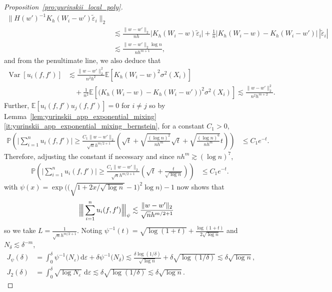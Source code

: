 \documentclass[11pt,lof]{puthesis}
\renewcommand{\P}{\ensuremath{\mathbb{P}}}
\newcommand{\E}{\ensuremath{\mathbb{E}}}
\newcommand{\Bigvvvert}{{\Big\vert\kern-0.3ex\Big\vert\kern-0.3ex\Big\vert}}
\DeclareMathOperator{\Var}{Var}
\newcommand{\diff}[1]{\,\mathrm{d}#1}
\theoremstyle{break}
\theoremstyle{proof}
\newtheorem{proof}{Proof}
\begin{document}
\begin{proof}[Proposition~\ref{pro:yurinskii_local_poly}]
\begin{align*}
\big\| H(w')^{-1} K_h(W_i-w')
\tilde\varepsilon_i \big\|_2 \\
&\lesssim
\frac{\|w-w'\|_2}{n h}
\big| K_h(W_i-w) \tilde\varepsilon_i \big|
+ \frac{1}{n}
\big| K_h(W_i-w) - K_h(W_i-w') \big|
\,|\tilde\varepsilon_i| \\
&\lesssim
\frac{\|w-w'\|_2 \log n}{n h^{m+1}},
\end{align*}
%
and from the penultimate line, we also deduce that
%
\begin{align*}
\Var[u_i(f,f')]
&\lesssim
\frac{\|w-w'\|_2^2}{n^2h^2}
\E\left[
K_h(W_i-w)^2 \sigma^2(X_i)
\right] \\
&\quad+
\frac{1}{n^2}
\E\left[
\big( K_h(W_i-w) - K_h(W_i-w') \big)^2
\sigma^2(X_i)
\right]
\lesssim
\frac{\|w-w'\|_2^2}{n^2h^{m+2}}.
\end{align*}
%
Further, $\E[u_i(f,f') u_j(f,f')] = 0$ for $i \neq j$ so
by Lemma~\ref{lem:yurinskii_app_exponential_mixing}%
\ref{it:yurinskii_app_exponential_mixing_bernstein},
for a constant $C_1>0$,
%
\begin{align*}
\P\left(
\Big| \sum_{i=1}^n u_i(f,f') \Big|
\geq \frac{C_1 \|w-w'\|_2}{\sqrt n h^{m/2+1}}
\left(
\sqrt{t}
+ \sqrt{\frac{(\log n)^2}{n h^m}} \sqrt t
+ \sqrt{\frac{(\log n)^6}{n h^m}} t
\right)
\right)
&\leq
C_1 e^{-t}.
\end{align*}
%
Therefore, adjusting the constant if necessary
and since $n h^{m} \gtrsim (\log n)^7$,
%
\begin{align*}
\P\left(
\Big| \sum_{i=1}^n u_i(f,f') \Big|
\geq
\frac{C_1 \|w-w'\|_2}{\sqrt{n} h^{m/2+1}}
\left(
\sqrt{t} + \frac{t}{\sqrt{\log n}}
\right)
\right)
&\leq
C_1 e^{-t}.
\end{align*}
%
 with
$\psi(x) =
\exp\Big(\big(\sqrt{1+2 x / \sqrt{\log n}}-1 \big)^2
\log n \Big)-1$
now shows that
%
\begin{align*}
\Bigvvvert \sum_{i=1}^n u_i(f,f') \Bigvvvert_\psi
&\lesssim
\frac{\|w-w'\|_2}{\sqrt{n} h^{m/2+1}}
\end{align*}
%
so we take $L = \frac{1}{\sqrt{n} h^{m/2+1}}$.
Noting
$\psi^{-1}(t) = \sqrt{\log(1+t)} + \frac{\log(1+t)}{2\sqrt{\log n}}$
and $N_\delta \lesssim \delta^{-m}$,
%
\begin{align*}
J_\psi(\delta)
&=
\int_0^\delta
\psi^{-1}\big( N_\varepsilon \big)
\diff{\varepsilon}
+ \delta
\psi^{-1} \big( N_\delta \big)
\lesssim
\frac{\delta \log(1/\delta)}{\sqrt{\log n}}
+ \delta \sqrt{\log(1/\delta)}
\lesssim
\delta \sqrt{\log n}, \\
J_2(\delta)
&=
\int_0^\delta
\sqrt{\log N_\varepsilon}
\diff{\varepsilon}
\lesssim
\delta \sqrt{\log(1/\delta)}
\lesssim
\delta \sqrt{\log n}.
\end{align*}


\end{proof}
\end{document}
